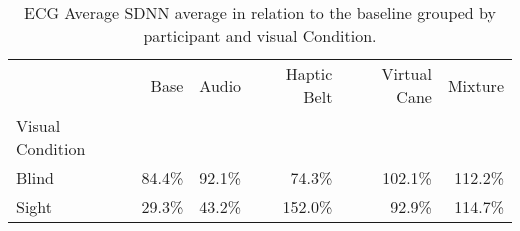 
\begin{table}[!htb]
\centering
\caption{ECG Average SDNN average in relation to the baseline grouped by participant and visual Condition.}
\label{tab:ecg_sdnn_average_group}
\begin{tabular}{lrrrrr}
\toprule
{} &    Base &   Audio & Haptic Belt & Virtual Cane &  Mixture \\
Visual Condition &         &         &             &              &          \\
\midrule
Blind            &  84.4\% &  92.1\% &      74.3\% &      102.1\% &  112.2\% \\
Sight            &  29.3\% &  43.2\% &     152.0\% &       92.9\% &  114.7\% \\
\bottomrule
\end{tabular}
\end{table}

